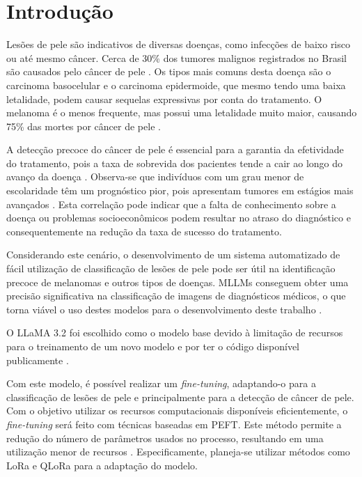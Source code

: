 \chapter{Introdução}

Lesões de pele são indicativos de diversas doenças, como infecções de baixo risco ou até mesmo câncer. Cerca de 30\% dos tumores malignos registrados no Brasil são
causados pelo câncer de pele \cite{skin_cancer_in_brazil}. Os tipos mais comuns desta doença são o carcinoma basocelular e o carcinoma epidermoide, que mesmo tendo uma
baixa letalidade, podem causar sequelas expressivas por conta do tratamento. O melanoma é o menos frequente, mas possui uma letalidade muito maior, causando 75\% das
mortes por câncer de pele \cite{skin_cancer_screening}.

A detecção precoce do câncer de pele é essencial para a garantia da efetividade do tratamento, pois a taxa de sobrevida dos pacientes tende a cair ao longo do avanço
da doença \cite{skin_cancer_survival}. Observa-se que indivíduos com um grau menor de escolaridade têm um prognóstico pior, pois apresentam tumores em estágios mais
avançados \cite{skin_cancer_socioeconomic}. Esta correlação pode indicar que a falta de conhecimento sobre a doença ou problemas socioeconômicos podem resultar no atraso
do diagnóstico e consequentemente na redução da taxa de sucesso do tratamento.

Considerando este cenário, o desenvolvimento de um sistema automatizado de fácil utilização de classificação de lesões de pele pode ser útil na identificação precoce de
melanomas e outros tipos de doenças. \acp{MLLM} conseguem obter uma precisão significativa na classificação de imagens de diagnósticos médicos, o que torna viável
o uso destes modelos para o desenvolvimento deste trabalho \cite{mllm_success_rate}.

O \ac{LLaMA 3.2} foi escolhido como o modelo base devido à limitação de recursos para o treinamento de um novo modelo e por ter o código disponível publicamente
\cite{llama}.

Com este modelo, é possível realizar um \textit{fine-tuning}, adaptando-o para a classificação de lesões de pele e principalmente para a detecção de câncer de pele. Com
o objetivo utilizar os recursos computacionais disponíveis eficientemente, o \textit{fine-tuning} será feito com técnicas baseadas em \ac{PEFT}. Este método permite a
redução do número de parâmetros usados no processo, resultando em uma utilização menor de recursos \cite{peft}. Especificamente, planeja-se utilizar métodos como
\ac{LoRa} e \ac{QLoRa} para a adaptação do modelo.

